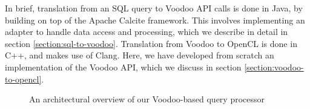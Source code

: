 In brief, translation from an SQL query to Voodoo API calls is done in Java, by building on top of the Apache Calcite framework. This involves implementing an adapter to handle data access and processing, which we describe in detail in section \ref{section:sql-to-voodoo}. Translation from Voodoo to OpenCL is done in C++, and makes use of Clang. Here, we have developed from scratch an implementation of the Voodoo API, which we discuss in section \ref{section:voodoo-to-opencl}.

\begin{figure}[p]
\vspace*{-1.4cm}
\centering
\vspace*{-0.7cm}
\caption{An architectural overview of our Voodoo-based query processor}
\label{fig:voodoo-architecture}
\end{figure}

